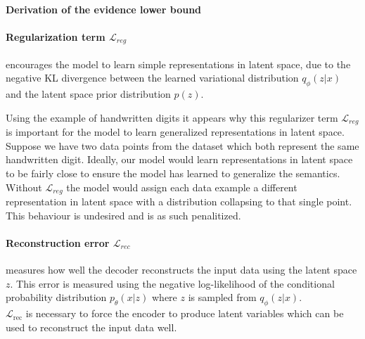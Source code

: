 \paragraph{Derivation of the evidence lower bound}



\paragraph{Regularization term $\mathcal{L}_{reg}$} encourages the model to learn simple representations in latent space, due to the negative KL divergence between the learned variational distribution $q_\phi(z|x)$ and the latent space prior distribution $p(z)$.


Using the example of handwritten digits it appears why this regularizer term $\mathcal{L}_{reg}$ is important for the model to learn generalized representations in latent space.
Suppose we have two data points from the dataset which both represent the same handwritten digit.
Ideally, our model would learn representations in latent space to be fairly close to ensure the model has learned to generalize the semantics. Without $\mathcal{L}_{reg}$ the model would assign each data example a different representation in latent space with a distribution collapsing to that single point. This behaviour is undesired and is as such penalitized.



\vspace{2cm}

\paragraph{Reconstruction error $\mathcal{L}_{rec}$} measures how well the decoder reconstructs the input data using the latent space $z$.
This error is measured using the negative log-likelihood of the conditional probability distribution $p_\theta(x|z)$ where $z$ is sampled from $q_\phi(z | x)$.\\
$\mathcal{L}_{\mathrm{rec}}$ is necessary to force the encoder to produce latent variables which can be used to reconstruct the input data well.

